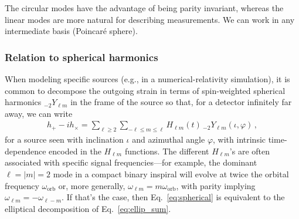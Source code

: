 \documentclass[aps,prd,twocolumn,superscriptaddress,preprintnumbers,floatfix,nofootinbib]{revtex4-2}
\newcommand*{\mi}[1]{}
\newcommand*{\mi}[1]{{\color{magenta} [{\bf MAX}: #1]}}
\begin{document}
The circular modes have the advantage of being parity invariant, whereas the linear modes are more natural for describing measurements.
We can work in any intermediate basis (Poincar\'e sphere).
\mi{introduce Jones vectors}

\subsubsection{Relation to spherical harmonics}
\label{sec:harmonics}

When modeling specific sources (e.g., in a numerical-relativity simulation), it is common to decompose the outgoing strain in terms of spin-weighted spherical harmonics ${}_{-2} Y_{\ell m}$ in the frame of the source so that, for a detector infinitely far away, we can write
\begin{align} \label{eq:spherical}
h_+ - i h_\times = \sum_{\ell \geq 2} \sum_{-\ell \leq m \leq \ell} H_{\ell m}(t)\, {}_{-2}Y_{\ell m} (\iota, \varphi)\, ,
\end{align}
for a source seen with inclination $\iota$ and azimuthal angle $\varphi$, with intrinsic time-dependence encoded in the $H_{\ell m}$ functions.
The different $H_{\ell m}$'s are often associated with specific signal frequencies---for example, the dominant $\ell= |m|=2$ mode in a compact binary inspiral will evolve at twice the orbital frequency $\omega_\mathrm{orb}$ or, more generally, $\omega_{\ell m} = m \omega_\mathrm{orb}$, with parity implying $\omega_{\ell m}= - \omega_{\ell - m}$.
If that's the case, then Eq.~\eqref{eq:spherical} is equivalent to the elliptical decomposition of Eq.~\eqref{eq:ellip_sum}.
\end{document}

